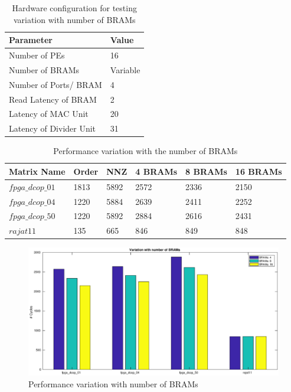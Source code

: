 \begin{table}[H]
    \centering
    \caption{Hardware configuration for testing variation with number of BRAMs}
    \label{tab:res:bramVar:hwConfig}
    \begin{tabular}{L{6cm} L{1.5cm}}
        \toprule
        Parameter & Value \\
        \midrule
        Number of PEs           & 16  \\
        Number of BRAMs         & Variable         \\
        Number of Ports/ BRAM   & 4         \\
        Read Latency of BRAM    & 2          \\
        Latency of MAC Unit     & 20          \\
        Latency of Divider Unit & 31          \\
        \bottomrule
    \end{tabular}
\end{table}

\begin{table}[H]
    \centering
    \caption{Performance variation with the number of BRAMs}
    \label{tab:res:bramVar:data}
    \begin{tabular}{l l l l l l} 
        \toprule
        Matrix Name & Order  & NNZ & 4 BRAMs& 8 BRAMs & 16 BRAMs \\
        \midrule
        $fpga\_dcop\_01$ & 1813 & 5892 &         2572    &    2336     &   2150   \\
        $fpga\_dcop\_04$ & 1220 & 5884 &         2639    &    2411     &   2252   \\
        $fpga\_dcop\_50$ & 1220 & 5892 &         2884    &    2616     &   2431   \\
        $rajat11$      & 135  &  665   &          846    &     849     &    848    \\
        \bottomrule
    \end{tabular}
\end{table}

\begin{figure}[H]
    \centering
    \includegraphics[width = \textwidth]{./Results/bramVar.eps}
    \caption{Performance variation with number of  BRAMs}
    \label{fig:res:bramVar:plot}
\end{figure}










